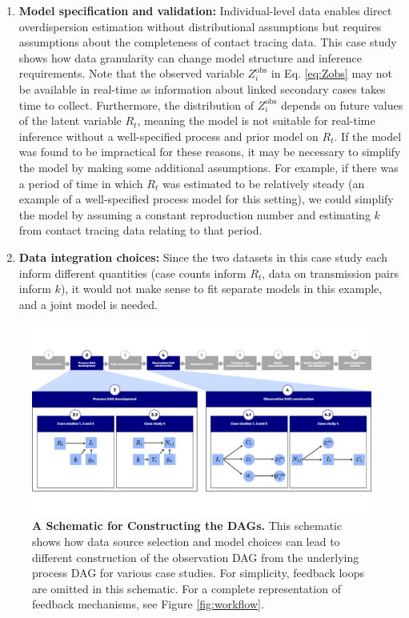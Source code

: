 \documentclass{article}
\begin{document}
\begin{enumerate}
    \item \textbf{Model specification and validation:} Individual-level data enables direct overdispersion estimation without distributional assumptions but requires assumptions about the completeness of contact tracing data. This case study shows how data granularity can change model structure and inference requirements. Note that the observed variable $Z^\mathrm{obs}_i$ in Eq. \eqref{eq:Zobs} may not be available in real-time as information about linked secondary cases takes time to collect. Furthermore, the distribution of $Z^\mathrm{obs}_i$ depends on future values of the latent variable $R_t$, meaning the model is not suitable for real-time inference without a well-specified process and prior model on $R_t$. If the model was found to be impractical for these reasons, it may be necessary to simplify the model by making some additional assumptions. For example, if there was a period of time in which $R_t$ was estimated to be relatively steady (an example of a well-specified process model for this setting), we could simplify the model by assuming a constant reproduction number and estimating $k$ from contact tracing data relating to that period. 

    \item \textbf{Data integration choices:} Since the two datasets in this case study each inform different quantities (case counts inform $R_t$, data on transmission pairs inform $k$), it would not make sense to fit separate models in this example, and a joint model is needed. 
\end{enumerate}




\begin{figure}[htbp]
    \centering
    \includegraphics[width=\textwidth]{figures/Abbott et al figure 7.png}
    \caption{\textbf{A Schematic for Constructing the DAGs.} This schematic shows how data source selection and model choices can lead to different construction of the observation DAG from the underlying process DAG for various case studies. For simplicity, feedback loops are omitted in this schematic. For a complete representation of feedback mechanisms, see Figure \ref{fig:workflow}.}
    \label{fig:case_study_diagram}
\end{figure}
\end{document}
